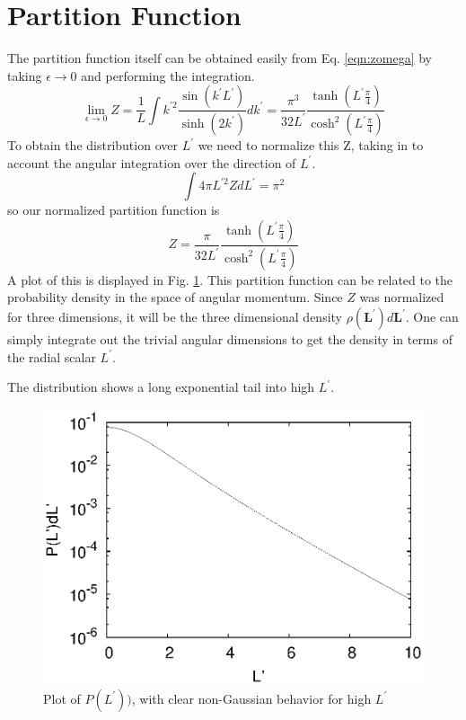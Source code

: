 \documentclass[11pt]{ucthesis}
\begin{document}
\section{Partition Function}
The partition function itself can be obtained easily from Eq. \ref{eqn:zomega} by taking $\epsilon \to 0$ and performing the integration.
\begin{equation}
\lim_{\epsilon \to 0} Z = \frac{1}{L} \int k^{\prime2} \frac{\sin(k^\prime L^\prime)}{\sinh(2k^\prime)}dk^\prime = \frac{\pi^3}{32L^\prime}\frac{\tanh(L^\prime \frac{\pi}{4})}{\cosh^2(L^\prime \frac{\pi}{4})}
\end{equation}
To obtain the distribution over $L^\prime$ we need to normalize this Z, taking in to account the angular integration over the direction of $L^\prime$.
\begin{equation}
\int 4\pi L^{\prime2} Z dL^\prime = \pi^2
\end{equation}
so our normalized partition function is 
\begin{equation}
Z = \frac{\pi}{32L^\prime}\frac{\tanh(L^\prime \frac{\pi}{4})}{\cosh^2(L^\prime \frac{\pi}{4})}
\end{equation}
A plot of this is displayed in Fig. \ref{fig:P}.
This partition function can be related to the probability density in the space of angular momentum. Since $Z$ was normalized for three dimensions, it will be the three dimensional density $\rho(\mathbf{L^\prime})d\mathbf{L^\prime}$. One can simply integrate out the trivial angular dimensions to get the density in terms of the radial scalar $L^\prime$.

The distribution shows a long exponential tail into high $L^\prime$.
\begin{figure}
\begin{center}
\includegraphics[width=\hsize]{P}
\caption{Plot of $P(L^\prime))$, with clear non-Gaussian behavior for high $L^\prime$}
\label{fig:P}
\end{center}
\end{figure}
\end{document}

